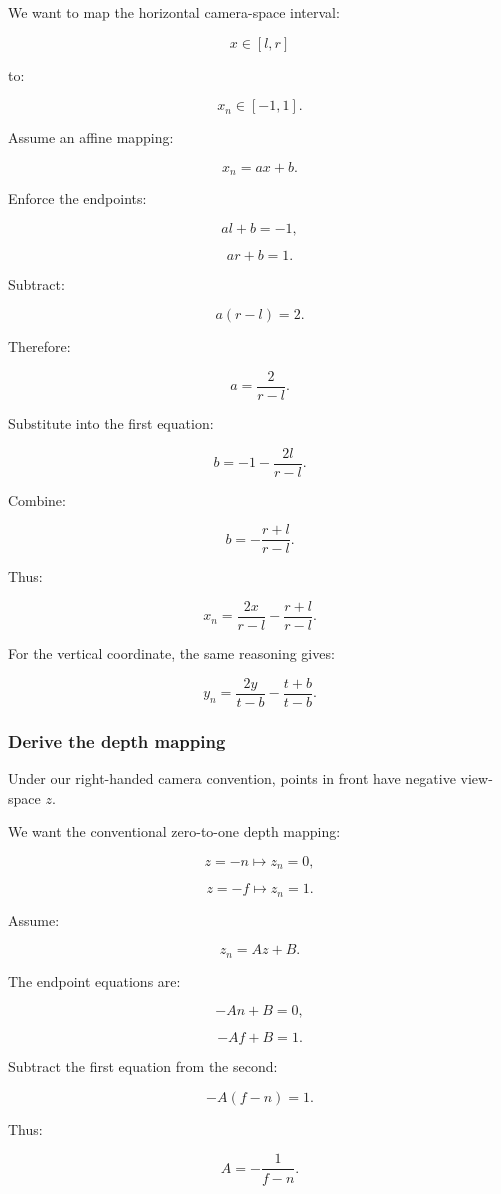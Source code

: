 We want to map the horizontal camera-space interval:

\[
 x\in[l,r]
\]

to:

\[
 x_n\in[-1,1].
\]

Assume an affine mapping:

\[
 x_n=ax+b.
\]

Enforce the endpoints:

\[
 al+b=-1,
\]

\[
 ar+b=1.
\]

Subtract:

\[
 a(r-l)=2.
\]

Therefore:

\[
 \boxed{ a=\frac2{r-l} }.
\]

Substitute into the first equation:

\[
 b=-1-\frac{2l}{r-l}.
\]

Combine:

\[
 \boxed{ b=-\frac{r+l}{r-l} }.
\]

Thus:

\[
 \boxed{ x_n= \frac{2x}{r-l} -\frac{r+l}{r-l} }.
\]

For the vertical coordinate, the same reasoning gives:

\[
 \boxed{ y_n= \frac{2y}{t-b} -\frac{t+b}{t-b} }.
\]

\subsubsection{Derive the depth mapping}\label{derive-the-depth-mapping}

Under our right-handed camera convention, points in front have negative view-space \(z\).

We want the conventional zero-to-one depth mapping:

\[
 z=-n\longmapsto z_n=0,
\]

\[
 z=-f\longmapsto z_n=1.
\]

Assume:

\[
 z_n=Az+B.
\]

The endpoint equations are:

\[
 -An+B=0,
\]

\[
 -Af+B=1.
\]

Subtract the first equation from the second:

\[
 -A(f-n)=1.
\]

Thus:

\[
 \boxed{ A=-\frac1{f-n} }.
\]

